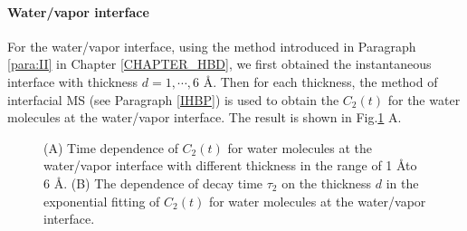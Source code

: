 \paragraph{Water/vapor interface} For the water/vapor interface, using the method introduced in Paragraph \ref{para:II} in Chapter \ref{CHAPTER_HBD}, 
we first obtained the instantaneous interface
with thickness $d=1, \cdots, 6$ \AA. Then for each thickness, the method of interfacial MS (see Paragraph \ref{IHBP}) 
is used to obtain the $C_2(t)$ for the water molecules at the water/vapor interface.
The result is shown in Fig.\thinspace\ref{fig:128w_c2_tau2_vs_thickness} A.
\begin{figure}[H]%
    \centering
    \qquad
    \caption{
(A) Time dependence of $C_2(t)$ for water molecules at the water/vapor interface with different thickness in the range of 1 \AA to 6 \AA. 
(B) The dependence of decay time $\tau_2$ on the thickness $d$ in the exponential fitting of $C_2(t)$ for water molecules at the water/vapor interface.
}%
    \label{fig:128w_c2_tau2_vs_thickness}%
\end{figure}

